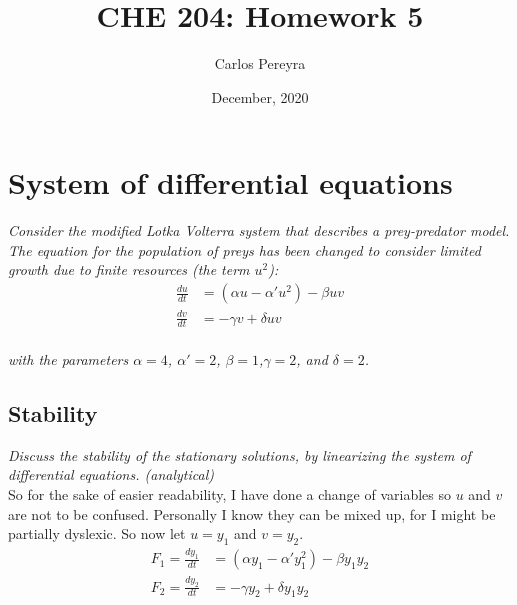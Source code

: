 \documentclass{article}
\begin{document}
 
 \title{CHE 204: Homework 5}
 \author{Carlos Pereyra}
 \date{December, 2020}
 \maketitle
 
 \section{System of differential equations}
\textit{Consider the modified Lotka Volterra system that describes a prey-predator model. The equation for the population of preys has been changed to consider limited growth due to finite resources (the term $u^2$):}\\
\begin{subequations}
\begin{align}
\label{eqn:given1} \frac{du}{dt} &= (\alpha u - \alpha' u^{2}) - \beta u v \\
\label{eqn:given2} \frac{dv}{dt} &= -\gamma v + \delta u v
\end{align}
\end{subequations}
\\
\textit{with the parameters $\alpha = 4$, $\alpha' = 2$, $\beta = 1$,$\gamma = 2$, and $\delta = 2$.}

\subsection{Stability}
\textit{Discuss the stability of the stationary solutions, by linearizing the system of differential equations. (analytical)}
\\
So for the sake of easier readability, I have done a change of variables so $u$ and $v$ are not to be confused. Personally I know they can be mixed up, for I might be partially dyslexic. So now let $u=y_1$ and $v=y_2$.
\begin{align}
\label{eqn:base1} F_1 = \frac{dy_1}{dt} &= (\alpha y_1 - \alpha' y_1^2) - \beta y_1 y_2\\
\label{eqn:base2} F_2 = \frac{dy_2}{dt} &= -\gamma y_2 + \delta y_1 y_2
\end{align}
\end{document}
